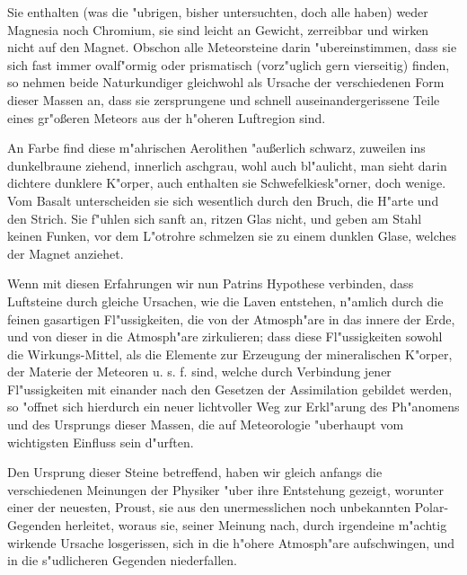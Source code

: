 \documentclass[a4paper, 11pt, oneside, polutonikogreek, german]{article}
\begin{document}
Sie enthalten (was die "ubrigen, bisher untersuchten, doch alle haben) weder Magnesia noch Chromium, sie sind leicht an Gewicht, zerreibbar und wirken nicht auf den Magnet. Obschon alle Meteorsteine darin "ubereinstimmen, dass sie sich fast immer ovalf"ormig oder prismatisch (vorz"uglich gern vierseitig) finden, so nehmen beide Naturkundiger gleichwohl als Ursache der verschiedenen Form dieser Massen an, dass sie zersprungene und schnell auseinandergerissene Teile eines gr"oßeren Meteors aus der h"oheren Luftregion sind.

An Farbe find diese m"ahrischen Aerolithen "außerlich schwarz, zuweilen ins dunkelbraune ziehend, innerlich aschgrau, wohl auch bl"aulicht, man sieht darin dichtere dunklere K"orper, auch enthalten sie Schwefelkiesk"orner, doch wenige. Vom Basalt unterscheiden sie sich wesentlich durch den Bruch, die H"arte und den Strich. Sie f"uhlen sich sanft an, ritzen Glas nicht, und geben am Stahl keinen Funken, vor dem L"otrohre schmelzen sie zu einem dunklen Glase, welches der Magnet anziehet.

Wenn mit diesen Erfahrungen wir nun Patrins Hypothese verbinden, dass Luftsteine durch gleiche Ursachen, wie die Laven entstehen, n"amlich durch die feinen gasartigen Fl"ussigkeiten, die von der Atmosph"are in das innere der Erde, und von dieser in die Atmosph"are zirkulieren; dass diese Fl"ussigkeiten sowohl die Wirkungs-Mittel, als die Elemente zur Erzeugung der mineralischen K"orper, der Materie der Meteoren u. s. f. sind, welche durch Verbindung jener Fl"ussigkeiten mit einander nach den Gesetzen der Assimilation gebildet werden, so "offnet sich hierdurch ein neuer lichtvoller Weg zur Erkl"arung des Ph"anomens und des Ursprungs dieser Massen, die auf Meteorologie "uberhaupt vom wichtigsten Einfluss sein d"urften.

Den Ursprung dieser Steine betreffend, haben wir gleich anfangs die verschiedenen Meinungen der Physiker "uber ihre Entstehung gezeigt, worunter einer der neuesten, Proust, sie aus den unermesslichen noch unbekannten Polar-Gegenden herleitet, woraus sie, seiner Meinung nach, durch irgendeine m"achtig wirkende Ursache losgerissen, sich in die h"ohere Atmosph"are aufschwingen, und in die s"udlicheren Gegenden niederfallen.
\end{document}
